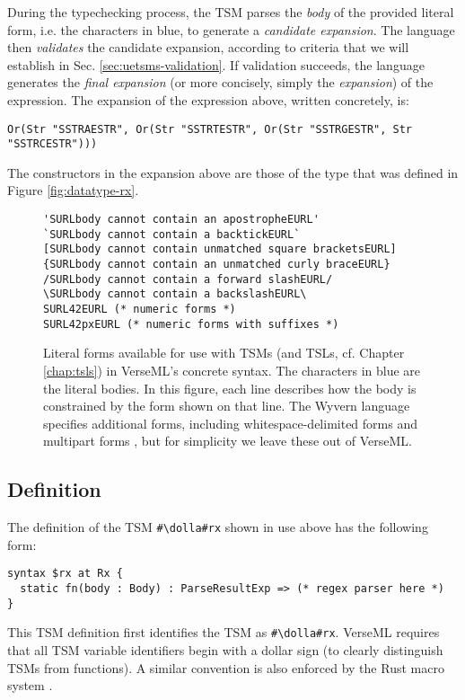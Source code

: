 During the typechecking process, the TSM parses the \emph{body} of the provided literal form, i.e. the characters in blue, to generate a \emph{candidate expansion}. The language then \emph{validates} the candidate expansion, according to criteria that we will establish in Sec. \ref{sec:uetsms-validation}. If validation succeeds, the language generates the \emph{final expansion} (or more concisely, simply the \emph{expansion}) of the expression. The expansion of the expression above, written concretely, is:
\begin{lstlisting}[numbers=none]
Or(Str "SSTRAESTR", Or(Str "SSTRTESTR", Or(Str "SSTRGESTR", Str "SSTRCESTR")))
\end{lstlisting}
The constructors in the expansion above are those of the type  that was defined in Figure \ref{fig:datatype-rx}.


\begin{figure}
\begin{lstlisting}
'SURLbody cannot contain an apostropheEURL'
`SURLbody cannot contain a backtickEURL`
[SURLbody cannot contain unmatched square bracketsEURL]
{SURLbody cannot contain an unmatched curly braceEURL}
/SURLbody cannot contain a forward slashEURL/
\SURLbody cannot contain a backslashEURL\
SURL42EURL (* numeric forms *)
SURL42pxEURL (* numeric forms with suffixes *)
\end{lstlisting}
\caption[Available Literal Forms]{Literal forms available for use with TSMs (and TSLs, cf. Chapter \ref{chap:tsls}) in VerseML's concrete syntax. The characters in blue are the literal bodies. In this figure, each line describes how the body is constrained by the form shown on that line. The Wyvern language specifies additional forms, including whitespace-delimited forms \cite{TSLs} and multipart forms \cite{sac15}, but for simplicity we leave these out of VerseML.}
\label{fig:literal-forms}
\end{figure}
\subsection{Definition}\label{sec:uetsms-definition}
The definition of the TSM \lstinline{#\dolla#rx} shown in use above has the following form:
\begin{lstlisting}[numbers=none,mathescape=|]
syntax $rx at Rx {
  static fn(body : Body) : ParseResultExp => (* regex parser here *)
}
\end{lstlisting}
This {TSM definition} first identifies the TSM as \lstinline{#\dolla#rx}. 
VerseML requires that all TSM variable identifiers begin with a dollar sign (to clearly distinguish TSMs from functions). A similar convention is also enforced by the Rust macro system \cite{Rust/Macros}.

